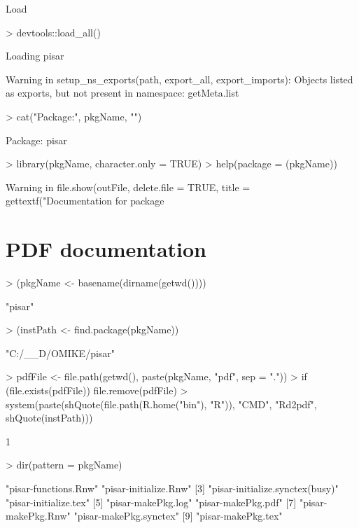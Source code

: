 \documentclass[a4paper,12pt]{article}\usepackage[]{graphicx}\usepackage[]{color}
\begin{document}
Load
\begin{Schunk}
\begin{Sinput}
> devtools::load_all()
\end{Sinput}
\begin{Soutput}
Loading pisar
\end{Soutput}
\begin{Soutput}
Warning in setup_ns_exports(path, export_all, export_imports): Objects listed as exports, but not present in namespace: getMeta.list
\end{Soutput}
\begin{Sinput}
> cat("Package:", pkgName, "\n")
\end{Sinput}
\begin{Soutput}
Package: pisar 
\end{Soutput}
\begin{Sinput}
> library(pkgName, character.only = TRUE)
> help(package = (pkgName))
\end{Sinput}
\begin{Soutput}
Warning in file.show(outFile, delete.file = TRUE, title = gettextf("Documentation for package %s", : '"C:\Program Files (x86)\EmEditor\EmEditor.exe"' not found
\end{Soutput}
\end{Schunk}

\section{PDF documentation}

\begin{Schunk}
\begin{Sinput}
> (pkgName <- basename(dirname(getwd())))
\end{Sinput}
\begin{Soutput}
[1] "pisar"
\end{Soutput}
\begin{Sinput}
> (instPath <- find.package(pkgName))
\end{Sinput}
\begin{Soutput}
[1] "C:/__D/OMIKE/pisar"
\end{Soutput}
\begin{Sinput}
> pdfFile <- file.path(getwd(), paste(pkgName, "pdf", sep = "."))
> if (file.exists(pdfFile)) file.remove(pdfFile)
> system(paste(shQuote(file.path(R.home("bin"), "R")), "CMD", "Rd2pdf", shQuote(instPath)))
\end{Sinput}
\begin{Soutput}
[1] 1
\end{Soutput}
\begin{Sinput}
> dir(pattern = pkgName)
\end{Sinput}
\begin{Soutput}
[1] "pisar-functions.Rnw"            "pisar-initialize.Rnw"          
[3] "pisar-initialize.synctex(busy)" "pisar-initialize.tex"          
[5] "pisar-makePkg.log"              "pisar-makePkg.pdf"             
[7] "pisar-makePkg.Rnw"              "pisar-makePkg.synctex"         
[9] "pisar-makePkg.tex"             
\end{Soutput}
\end{Schunk}
\end{document}
